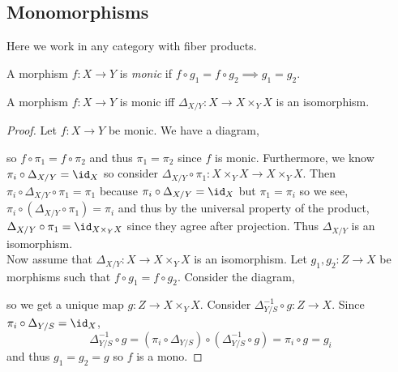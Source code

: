\documentclass[12pt]{article}
\begin{document}
\subsection{Monomorphisms}

\begin{rmk}
Here we work in any category with fiber products.
\end{rmk}

\begin{defn}
A morphism $f : X \to Y$ is \textit{monic} if $f \circ g_1 = f \circ g_2 \implies g_1 = g_2$.
\end{defn}

\begin{prop}
A morphism $f : X \to Y$ is monic iff $\Delta_{X/Y} : X \to X \times_Y X$ is an isomorphism.
\end{prop}

\begin{proof}
Let $f : X \to Y$ be monic. We have a diagram,
\begin{center}
\end{center}
so $f \circ \pi_1 = f \circ \pi_2$ and thus $\pi_1 = \pi_2$ since $f$ is monic. Furthermore, we know $\pi_i \circ \Delta_{X/Y} = \id_X$ so consider $\Delta_{X/Y} \circ \pi_1 : X \times_Y X \to X \times_Y X$. Then $\pi_i \circ \Delta_{X/Y} \circ \pi_1 = \pi_1$ because $\pi_i \circ \Delta_{X/Y} = \id_X$ but $\pi_1 = \pi_i$ so we see, $\pi_i \circ (\Delta_{X/Y} \circ \pi_1) = \pi_i$ and thus by the universal property of the product, $\Delta_{X/Y} \circ \pi_1 = \id_{X \times_Y X}$ since they agree after projection. Thus $\Delta_{X/Y}$ is an isomorphism.
\bigskip\\
Now assume that $\Delta_{X/Y} : X \to X \times_Y X$ is an isomorphism. Let $g_1, g_2 : Z \to X$ be morphisms such that $f \circ g_1 = f \circ g_2$. Consider the diagram,
\begin{center}
\end{center}
so we get a unique map $g : Z \to X \times_Y X$. Consider $\Delta_{Y/S}^{-1} \circ g : Z \to X$. Since $\pi_i \circ \Delta_{Y/S} = \id_X$,
\[ \Delta_{Y/S}^{-1} \circ g = (\pi_i \circ \Delta_{Y/S}) \circ (\Delta_{Y/S}^{-1} \circ g) = \pi_i \circ g = g_i \]
and thus $g_1 = g_2 = g$ so $f$ is a mono.
\end{proof}
\end{document}
